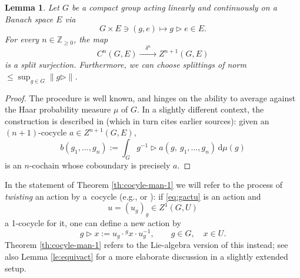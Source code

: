 \documentclass[10pt,a4paper]{amsart}
\numberwithin{equation}{section}
\newtheorem{Lemma}[Theorem]{Lemma}
\newcommand\bZ{{\mathbb Z}}
\begin{document}
\begin{Lemma}\label{le:cansplit}
 Let $G$ be a compact group acting linearly and continuously on a Banach space $E$ via
 \begin{equation*}
 G\times E\ni (g,e)\mapsto g\triangleright e\in E.
 \end{equation*}
 For every $n\in \bZ_{\ge 0}$, the map
 \begin{equation*}%
 C^n(G,E)\xrightarrow{\quad\delta^n\quad} Z^{n+1}(G,E)
 \end{equation*}
 is a split surjection. Furthermore, we can choose splittings of norm $\le \sup_{g\in G}\|g\triangleright\|$.
\end{Lemma}
\begin{proof}
 The procedure is well known, and hinges on the ability to average against the Haar probability measure $\mu$ of $G$. In a slightly different context, the construction is described in \cite[Proof of Theorem~2.3]{moo-12} (which in turn cites earlier sources): given an $(n+1)$-cocycle ${a\in Z^{n+1}(G,E)}$,
 \begin{equation}\label{eq:splitgpcoc}
 b(g_1,\dots,g_{n}):=\int_{G}g^{-1}\triangleright a(g,\ g_1,\dots,g_n)\, \mathrm{d}\mu(g)
 \end{equation}
 is an $n$-cochain whose coboundary is precisely $a$.
\end{proof}

In the statement of Theorem \ref{th:cocyle-man-1} we will refer to the process of {\it twisting} an action by a~cocycle (e.g., \cite[Section~I.5.3, Example 2 preceding Proposition 34]{ser-gal} or \cite[Definition X.1.4, equation~(8)]{tak2}): if \eqref{eq:gactu} is an action and
\begin{equation*}
 u = (u_g)_g\in Z^1(G,U)
\end{equation*}
a 1-cocycle for it, one can define a new action by
\begin{equation*}
 g\triangleright x := u_g \cdot {}^g x \cdot u_g^{-1},\qquad g\in G,\quad x\in U.
\end{equation*}
Theorem \ref{th:cocyle-man-1} refers to the Lie-algebra version of this instead; see also Lemma \ref{le:equivact} for a more elaborate discussion in a slightly extended setup.
\end{document}
